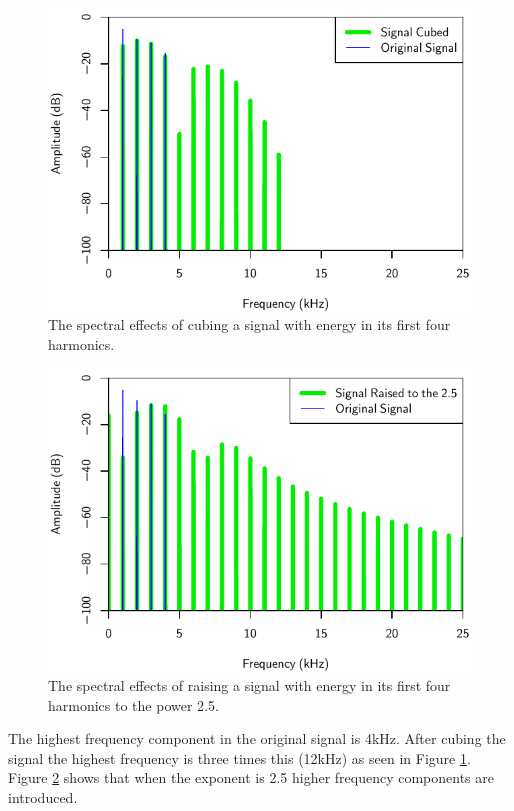 			\begin{figure}[h!]
				\centering
				\includegraphics{chapter5/Images/CubedSpectra.pdf}
				\caption{The spectral effects of cubing a signal with energy in its first four harmonics.}
				\label{fig:CubedSpectra}
			\end{figure}

			\begin{figure}[h!]
				\centering
				\includegraphics{chapter5/Images/RaisedToTwoAndAHalfSpectra.pdf}
				\caption{The spectral effects of raising a signal with energy in its first four harmonics
					 to the power 2.5.}
				\label{fig:TwoAndAHalfSpectra}
			\end{figure}

			The highest frequency component in the original signal is 4kHz. After cubing the signal the highest
			frequency is three times this (12kHz) as seen in Figure \ref{fig:CubedSpectra}. Figure
			\ref{fig:TwoAndAHalfSpectra} shows that when the exponent is 2.5 higher frequency components are
			introduced. 

